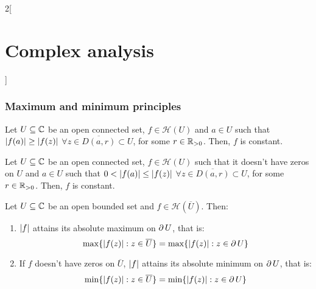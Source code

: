 \documentclass[../../../main_math.tex]{subfiles}
\begin{document}
\begin{multicols}{2}[\section{Complex analysis}]
  \subsubsection{Maximum and minimum principles}
  \begin{theorem}
    Let $U\subseteq\mathbb{C}$ be an open connected set, $f\in\mathcal{H}(U)$ and $a\in U$ such that $\abs{f(a)}\geq \abs{f(z)}$ $\forall z\in \overline{D(a,r)}\subset U$, for some $r\in\mathbb{R}_{>0}$. Then, $f$ is constant.
  \end{theorem}
  \begin{corollary}
    Let $U\subseteq\mathbb{C}$ be an open connected set, $f\in\mathcal{H}(U)$ such that it doesn't have zeros on $U$ and $a\in U$ such that $0<\abs{f(a)}\leq \abs{f(z)}$ $\forall z\in \overline{D(a,r)}\subset U$, for some $r\in\mathbb{R}_{>0}$. Then, $f$ is constant.
  \end{corollary}
  \begin{corollary}
    Let $U\subseteq\mathbb{C}$ be an open bounded set and $f\in\mathcal{H}(\overline{U})$. Then:
    \begin{enumerate}
      \item $\abs{f}$ attains its absolute maximum on $\operatorname{\partial}{U}$, that is: $$\max\{\abs{f(z)}:z\in\overline{U}\}=\max\{\abs{f(z)}:z\in\operatorname{\partial} U\}$$
      \item If $f$ doesn't have zeros on $\overline{U}$, $\abs{f}$ attains its absolute minimum on $\operatorname{\partial}{U}$, that is: $$\min\{\abs{f(z)}:z\in\overline{U}\}=\min\{\abs{f(z)}:z\in\operatorname{\partial} U\}$$
    \end{enumerate}
  \end{corollary}

\end{multicols}
\end{document}
